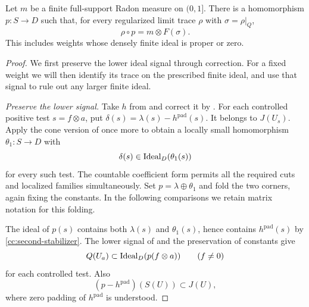 \begin{theorem}\label{cc:cone-existence}
Let $m$ be a finite full-support Radon measure on $(0,1]$.
There is a homomorphism $p:S\to D$ such that, for every
regularized limit trace $\rho$ with $\sigma=\rho|_Q$,
\begin{equation}\label{cc:full-cone-formula}
 \rho\circ p=m\otimes F(\sigma).
\end{equation}
This includes weights whose densely finite ideal is proper
or zero.
\end{theorem}

\begin{proof}
We first preserve the lower ideal signal through correction.  For a fixed
weight we will then identify its trace on the prescribed finite ideal,
and use that signal to rule out any larger finite ideal.

\smallskip\noindent\emph{Preserve the lower signal.} 
Take $h$ from  and correct it by
.  For each controlled positive test
$s=f\otimes a$, put
$\delta(s)=\lambda(s)-h^{\mathrm{pad}}(s)$.
It belongs to $J(U_s)$.  Apply the cone version of
 once more to obtain a locally small
homomorphism $\theta_1:S\to D$ with
\begin{equation}\label{cc:second-stabilizer}
 \delta(s)\in\operatorname{Ideal}_D(\theta_1(s))
\end{equation}
for every such test.  The countable coefficient form permits
all the required cuts and localized families simultaneously.
Set $p=\lambda\oplus\theta_1$ and fold the two corners,
again fixing the constants.  In the following comparisons
we retain matrix notation for this folding.

The ideal of $p(s)$ contains both $\lambda(s)$ and
$\theta_1(s)$, hence contains $h^{\mathrm{pad}}(s)$ by
\eqref{cc:second-stabilizer}.  The lower signal of
 and the preservation of constants give
\begin{equation}\label{cc:retained-signal}
 Q(U_a)\subset\operatorname{Ideal}_D(p(f\otimes a))
 \qquad(f\ne0)
\end{equation}
for each controlled test.  Also
\begin{equation}\label{cc:total-smallness}
 (p-h^{\mathrm{pad}})(S(U))\subset J(U),
\end{equation}
where zero padding of $h^{\mathrm{pad}}$ is understood.


\end{proof}
